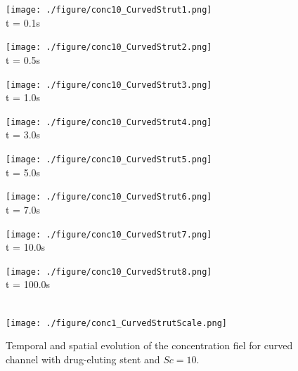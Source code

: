 \documentclass[10pt,fleqn,a4paper,twoside]{article}
\begin{document}
\begin{figure}[H]
     \begin{minipage}{.50\linewidth}
      \centering
      \texttt{[image: ./figure/conc10\_CurvedStrut1.png]}\\
      t = 0.1s
     \end{minipage}%
     \begin{minipage}{.50\linewidth}
      \centering
      \texttt{[image: ./figure/conc10\_CurvedStrut2.png]}\\
      t = 0.5s
     \end{minipage}
     \begin{minipage}{.50\linewidth}
     \medskip
      \centering
      \texttt{[image: ./figure/conc10\_CurvedStrut3.png]}\\
      t = 1.0s
     \end{minipage}%
     \begin{minipage}{.50\linewidth}
     \medskip
      \centering
      \texttt{[image: ./figure/conc10\_CurvedStrut4.png]}\\
      t = 3.0s
     \end{minipage}
     \begin{minipage}{.50\linewidth}
      \centering
      \texttt{[image: ./figure/conc10\_CurvedStrut5.png]}\\
      t = 5.0s
     \end{minipage}%
     \begin{minipage}{.50\linewidth}
      \centering
      \texttt{[image: ./figure/conc10\_CurvedStrut6.png]}\\
      t = 7.0s
     \end{minipage}
     \begin{minipage}{.50\linewidth}
     \medskip
      \centering
      \texttt{[image: ./figure/conc10\_CurvedStrut7.png]}\\
      t = 10.0s
     \end{minipage}%
     \begin{minipage}{.50\linewidth}
     \medskip
      \centering
      \texttt{[image: ./figure/conc10\_CurvedStrut8.png]}\\
      t = 100.0s
     \end{minipage}\\[10pt]
      \centering
      \texttt{[image: ./figure/conc1\_CurvedStrutScale.png]}\\
     \medskip
     \label{conc field curved stent sc 10}
    \caption{
Temporal and spatial evolution of the concentration fiel for curved channel with drug-eluting stent and $Sc=10$.}
\end{figure}
\end{document}
